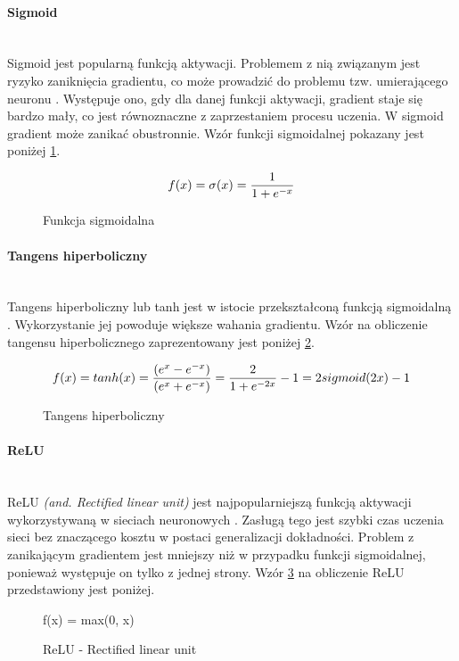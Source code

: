 \paragraph{Sigmoid} \mbox{}\\
Sigmoid jest popularną funkcją aktywacji. Problemem z nią związanym
jest ryzyko zaniknięcia gradientu, co może prowadzić do problemu tzw. umierającego
neuronu \cite{activationFunctions}. Występuje ono, gdy dla danej funkcji aktywacji,
gradient staje się bardzo mały, co jest równoznaczne z zaprzestaniem procesu uczenia.
W sigmoid gradient może zanikać obustronnie. Wzór funkcji sigmoidalnej pokazany jest poniżej \ref{eq:sigmoid}.
\begin{figure}[h!]
\renewcommand{\figurename}{Wzór}%
\begin{equation*}
f(x) = \sigma(x) = \frac{1}{1 + e^{-x}} \\
\end{equation*}
\caption{Funkcja sigmoidalna}
\label{eq:sigmoid}
\end{figure}

\paragraph{Tangens hiperboliczny} \mbox{}\\
Tangens hiperboliczny lub tanh jest w istocie przekształconą funkcją sigmoidalną
\cite{activationFunctions, activationFunctionsV2}. Wykorzystanie
jej powoduje większe wahania gradientu. Wzór na obliczenie tangensu hiperbolicznego
zaprezentowany jest poniżej \ref{eq:tanh}.
\begin{figure}[h!]
\renewcommand{\figurename}{Wzór}%
\begin{equation*}
f(x) = tanh(x) = \frac{(e^x - e^{-x})}{(e^x + e^{-x})} = \frac{2}{1+e^{-2x}} - 1 = 2 sigmoid(2x) - 1\\
\end{equation*}
\caption{Tangens hiperboliczny}
\label{eq:tanh}
\end{figure}

\paragraph{ReLU} \mbox{}\\
ReLU \textit{(and. Rectified linear unit)} jest najpopularniejszą funkcją
aktywacji wykorzystywaną w sieciach neuronowych \cite{CS231n_activ, WIKIrectifier}.
Zasługą tego jest szybki czas uczenia sieci bez znaczącego kosztu w postaci generalizacji
dokładności. Problem z zanikającym gradientem jest mniejszy niż w przypadku funkcji
sigmoidalnej, ponieważ występuje on tylko z jednej strony.
Wzór \ref{eq:relu} na obliczenie ReLU przedstawiony jest poniżej.
\begin{figure}[h!]
\renewcommand{\figurename}{Wzór}%
\begin{equation**}
f(x) = max(0, x)
\end{equation**}
\caption{ReLU - Rectified linear unit}
\label{eq:relu}
\end{figure}

